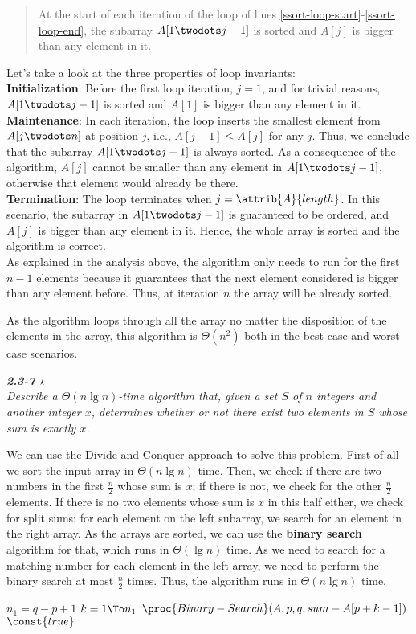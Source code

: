 \documentclass[8pt,a4paper]{article}
\begin{document}
\begin{quotation}
  At the start of each iteration of the \For loop of lines \ref{ssort-loop-start}-\ref{ssort-loop-end},
  the subarray $A[1 \twodots j-1]$ is sorted and $A[j]$ is bigger than any element in it.
\end{quotation}

Let's take a look at the three properties of loop invariants: \\

\textbf{Initialization}: Before the first loop iteration, $j = 1$, and for trivial
reasons, $A[1 \twodots j-1]$ is sorted and $A[1]$ is bigger than any element in it. \\

\textbf{Maintenance}: In each iteration, the loop inserts the smallest element from
$A[j \twodots n]$ at position $j$, i.e., $A[j-1] \leq A[j]$ for any $j$. Thus, we conclude
that the subarray $A[1 \twodots j-1]$ is always sorted. As a consequence of the algorithm,
$A[j]$ cannot be smaller than any element in $A[1 \twodots j-1]$, otherwise that element
would already be there. \\

\textbf{Termination}: The loop terminates when $j = \attrib{A}{length}$. In this scenario,
the subarray in $A[1 \twodots j-1]$ is guaranteed to be ordered, and $A[j]$ is bigger than
any element in it. Hence, the whole array is sorted and the algorithm is correct. \\

As explained in the analysis above, the algorithm only needs to run for the first $n - 1$
elements because it guarantees that the next element considered is bigger than any element
before. Thus, at iteration $n$ the array will be already sorted.

As the algorithm loops through all the array no matter the disposition of the elements in
the array, this algorithm is $\Theta(n^{2})$ both in the best-case and worst-case scenarios.

\begin{framed}
\textbf{\textit{2.3-7} $\star$} \\
\textit{Describe a $\Theta(n \lg n)$-time algorithm that, given a set $S$ of $n$ integers
and another integer $x$, determines whether or not there exist two elements in $S$ whose
sum is exactly $x$.}
\end{framed}

We can use the Divide and Conquer approach to solve this problem. First of all we sort
the input array in $\Theta(n \lg n)$ time. Then, we check if there are two numbers in the
first $\frac{n}{2}$ whose sum is $x$; if there is not, we check for the other $\frac{n}{2}$
elements. If there is no two elements whose sum is $x$ in this half either, we check for
split sums: for each element on the left subarray, we search for an element in the right
array. As the arrays are sorted, we can use the \textbf{binary search} algorithm for that,
which runs in $\Theta(\lg n)$ time. As we need to search for a matching number for each element
in the left array, we need to perform the binary search at most $\frac{n}{2}$ times. Thus,
the algorithm runs in $\Theta(n \lg n)$ time.

\begin{codebox}
  \li $n_1 = q - p + 1$
  \li \For $k = 1 \To n_1$
        \Do
  \li     \If $\proc{Binary-Search}(A, p, q, sum - A[p + k - 1])$
            \Then
            \li         \Return $\const{true}$
        \End
\end{codebox}
\end{document}
